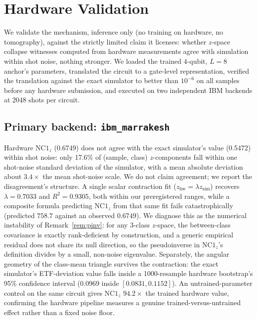 \documentclass[pdflatex,sn-mathphys-ay]{sn-jnl}
\theoremstyle{thmstyleone}
\theoremstyle{thmstyletwo}
\begin{document}
\section{Hardware Validation}
\label{sec:hardware}

We validate the mechanism, inference only (no training on hardware, no tomography), against the strictly limited claim it licenses: whether $z$-space collapse witnesses computed from hardware measurements agree with simulation within shot noise, nothing stronger. We loaded the trained 4-qubit, $L{=}8$ anchor's parameters, translated the circuit to a gate-level representation, verified the translation against the exact simulator to better than $10^{-6}$ on all samples before any hardware submission, and executed on two independent IBM backends at 2048 shots per circuit.

\subsection{Primary backend: \texttt{ibm\_marrakesh}}
\label{sec:hw-marrakesh}

Hardware $\mathrm{NC1}_z$ (0.6749) does not agree with the exact simulator's value (0.5472) within shot noise: only 17.6\% of (sample, class) $z$-components fall within one shot-noise standard deviation of the simulator, with a mean absolute deviation about $3.4\times$ the mean shot-noise scale. We do not claim agreement; we report the disagreement's structure. A single scalar contraction fit ($z_\mathrm{hw} = \lambda z_\mathrm{sim}$) recovers $\lambda=0.7033$ and $R^2=0.9305$, both within our preregistered ranges, while a composite formula predicting $\mathrm{NC1}_z$ from that same fit fails catastrophically (predicted $758.7$ against an observed $0.6749$). We diagnose this as the numerical instability of Remark~\ref{rem:pinv}: for any 3-class $z$-space, the between-class covariance is exactly rank-deficient by construction, and a generic empirical residual does not share its null direction, so the pseudoinverse in $\mathrm{NC1}_z$'s definition divides by a small, non-noise eigenvalue. Separately, the angular geometry of the class-mean triangle survives the contraction: the exact simulator's ETF-deviation value falls inside a 1000-resample hardware bootstrap's 95\% confidence interval ($0.0969$ inside $[0.0831, 0.1152]$). An untrained-parameter control on the same circuit gives $\mathrm{NC1}_z$ $94.2\times$ the trained hardware value, confirming the hardware pipeline measures a genuine trained-versus-untrained effect rather than a fixed noise floor.
\end{document}

